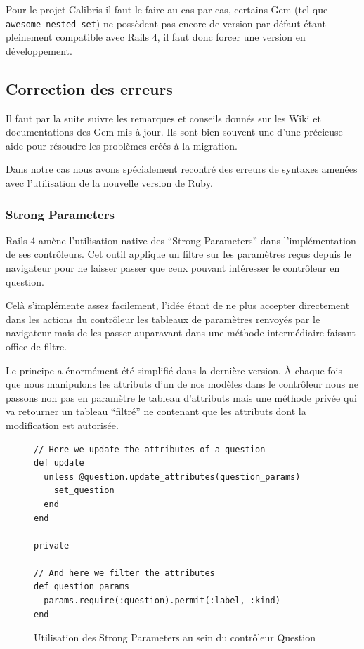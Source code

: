 \documentclass[12pt,a4paper]{book}
\begin{document}
Pour le projet Calibris il faut le faire au cas par cas, certains Gem (tel que \texttt{awesome-nested-set}) ne possèdent pas encore de version par défaut étant pleinement compatible avec Rails 4, il faut donc forcer une version en développement.

\subsection{Correction des erreurs}

Il faut par la suite suivre les remarques et conseils donnés sur les Wiki et documentations des Gem mis à jour. Ils sont bien souvent une d'une précieuse aide pour résoudre les problèmes créés à la migration. 

Dans notre cas nous avons spécialement recontré des erreurs de syntaxes amenées avec l'utilisation de la nouvelle version de Ruby.

\subsubsection{Strong Parameters}

Rails 4 amène l'utilisation native des ``Strong Parameters'' dans l'implémentation de ses contrôleurs. Cet outil applique un filtre sur les paramètres reçus depuis le navigateur pour ne laisser passer que ceux pouvant intéresser le contrôleur en question.

Celà s'implémente assez facilement, l'idée étant de ne plus accepter directement dans les actions du contrôleur les tableaux de paramètres renvoyés par le navigateur mais de les passer auparavant dans une méthode intermédiaire faisant office de filtre.

Le principe a énormément été simplifié dans la dernière version. À chaque fois que nous manipulons les attributs d'un de nos modèles dans le contrôleur nous ne passons non pas en paramètre le tableau d'attributs mais une méthode privée qui va retourner un tableau ``filtré'' ne contenant que les attributs dont la modification est autorisée.

    \begin{figure}[h]
    \lstset{language=ruby}
    \begin{lstlisting}
// Here we update the attributes of a question
def update
  unless @question.update_attributes(question_params)
    set_question
  end
end

private

// And here we filter the attributes 
def question_params
  params.require(:question).permit(:label, :kind)
end
    \end{lstlisting}
     \caption{Utilisation des Strong Parameters au sein du contrôleur Question}
    \end{figure}
    
\end{document}
